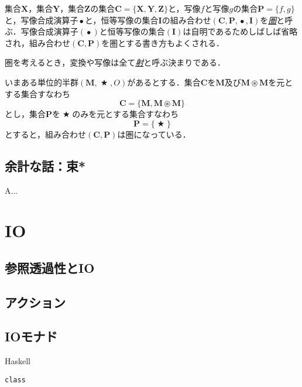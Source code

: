 \documentclass[a5paper,draft]{jsbook}
\newcommand{\programminglanguage}[1]{\textsf{#1}}
\newcommand{\haskell}{\programminglanguage{Haskell}}
\newcommand{\keyword}[1]{{\underline{\emph{#1}}}}
\newenvironment{haskellcode}{\begin{itembox}[r]{\haskell}}{\end{itembox}}
\newcommand{\mathSet}[1]{\mathbf{#1}} %
\newcommand{\mathBinaryOperator}[1]{\operatorname{#1}}
\newcommand{\mathAnyBinaryOperator}{\mathBinaryOperator{\bigstar}}
\newcommand{\mathCompose}{\mathBinaryOperator{\bullet}}
\newcommand{\mathSetTimes}{\mathBinaryOperator{\circledast}}
\newcommand{\mathCategoryShort}[2]{(#1,#2)}
\newcommand{\mathMonoid}[3]{(#1,#2,#3)}
\newcommand{\mathCategory}[4]{(#1,#2,#3,#4)}
\begin{document}
集合$\mathSet{X}$，集合$\mathSet{Y}$，集合$\mathSet{Z}$の集合$\mathSet{C}=\{\mathSet{X},\mathSet{Y},\mathSet{Z}\}$と，写像$f$と写像$g$の集合$\mathSet{P}=\{f,g\}$と，写像合成演算子$\mathCompose$と，恒等写像の集合$\mathSet{I}$の組み合わせ$\mathCategory{\mathSet{C}}{\mathSet{P}}{\mathCompose}{\mathSet{I}}$を\keyword{圏}と呼ぶ．写像合成演算子$(\mathCompose)$と恒等写像の集合$(\mathSet{I})$は自明であるためしばしば省略され，組み合わせ$\mathCategoryShort{\mathSet{C}}{\mathSet{P}}$を圏とする書き方もよくされる．

圏を考えるとき，変換や写像は全て\keyword{射}と呼ぶ決まりである．

いまある単位的半群$\mathMonoid{\mathSet{M}}{\mathAnyBinaryOperator}{O}$があるとする．集合$\mathSet{C}$を$\mathSet{M}$及び$\mathSet{M}\mathSetTimes\mathSet{M}$を元とする集合すなわち
\begin{equation}
\mathSet{C}=\{\mathSet{M},\mathSet{M}\mathSetTimes\mathSet{M}\}
\end{equation}
とし，集合$\mathSet{P}$を$\mathAnyBinaryOperator$のみを元とする集合すなわち
\begin{equation}
\mathSet{P}=\{\mathAnyBinaryOperator\}
\end{equation}
とすると，組み合わせ$\mathCategoryShort{\mathSet{C}}{\mathSet{P}}$は圏になっている．

\section{余計な話：束*}

A...


\chapter{IO}

\section{参照透過性とIO}

\section{アクション}

\section{IOモナド}

\begin{haskellcode}
\begin{verbatim}
class
\end{verbatim}
\end{haskellcode}
\end{document}
